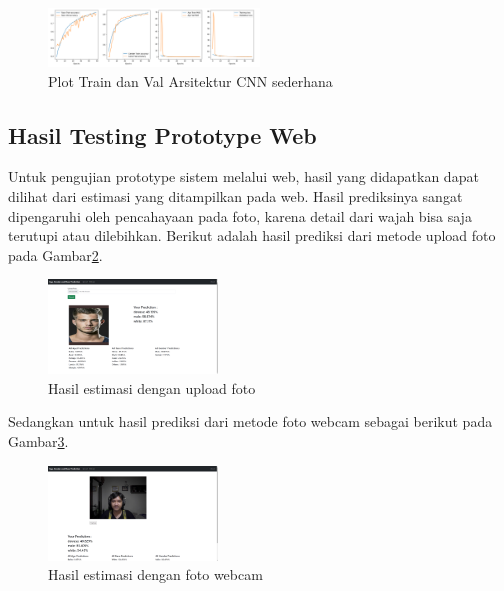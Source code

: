\begin{enumerate}[nolistsep]
  \begin{figure} [ht]
    \centering
    \includegraphics[width=0.5\textwidth]{gambar/PlotModel.png}

    \caption{Plot Train dan Val Arsitektur CNN sederhana}
    \label{fig:PlotCNNSederhana}
  \end{figure}

\subsection{Hasil Testing Prototype Web}
\label{sec:hasiltestingprotoype}

  Untuk pengujian prototype sistem melalui web, hasil yang didapatkan dapat dilihat dari estimasi yang ditampilkan pada 
  web. Hasil prediksinya sangat dipengaruhi oleh pencahayaan pada foto, karena detail dari wajah bisa saja terutupi atau 
  dilebihkan. Berikut adalah hasil prediksi dari metode upload foto pada Gambar\ref{fig:upload}.

  \begin{figure} [ht]
    \centering
    \includegraphics[width=0.4\textwidth]{gambar/web.png}

    \caption{Hasil estimasi dengan upload foto}
    \label{fig:upload}
  \end{figure}

  Sedangkan untuk hasil prediksi dari metode foto webcam sebagai berikut pada Gambar\ref{fig:webcam}.

  \begin{figure} [ht]
    \centering
    \includegraphics[width=0.4\textwidth]{gambar/web2.png}

    \caption{Hasil estimasi dengan foto webcam}
    \label{fig:webcam}
  \end{figure}

\end{enumerate}